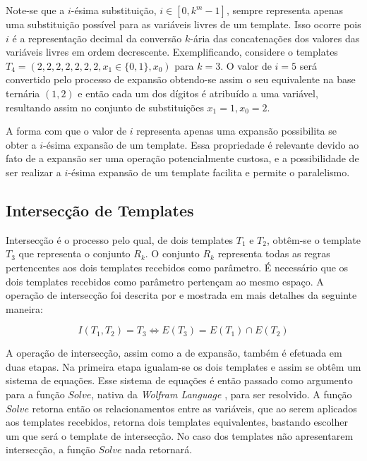 Note-se que a $i$-ésima substituição, $i \in [0,k^m-1]$, sempre representa apenas uma substituição possível para as variáveis livres de um template. Isso ocorre pois $i$ é a representação decimal da conversão $k$-ária das concatenações dos valores das variáveis livres em ordem decrescente. Exemplificando, considere o templates $T_4 = (2,2,2,2,2,2,2,x_1\in \{0,1\},x_0)$ para $k=3$. O valor de $i=5$ será convertido pelo processo de expansão obtendo-se assim o seu equivalente na base ternária $(1,2)$ e então cada um dos dígitos é atribuído a uma variável, resultando assim no conjunto de substituições ${x_1=1,x_0=2}$.

A forma com que o valor de $i$ representa apenas uma expansão possibilita se obter a $i$-ésima expansão de um template. Essa propriedade é relevante devido ao fato de a expansão ser uma operação potencialmente custosa, e a possibilidade de ser realizar a $i$-ésima expansão de um template facilita e permite o paralelismo.

\newpage\newpage
\subsection{Intersecção de Templates}
Intersecção é o processo pelo qual, de dois templates $T_1$ e $T_2$, obtêm-se o template $T_3$ que representa o conjunto $R_k$. O conjunto $R_k$ representa todas as regras pertencentes aos dois templates recebidos como parâmetro. É necessário que os dois templates recebidos como parâmetro pertençam ao mesmo espaço. A operação de intersecção foi descrita por  e mostrada em mais detalhes da seguinte maneira:

\begin{equation}
I(T_1,T_2)=T_3 \Leftrightarrow E(T_3) = E(T_1) \cap E(T_2)
\end{equation}

A operação de intersecção, assim como a de expansão, também é efetuada em duas etapas. Na primeira etapa igualam-se os dois templates e assim se obtêm um sistema de equações. Esse sistema de equações é então passado como argumento para a função $Solve$, nativa da \textit{Wolfram Language} \cite{woframMathematica10}, para ser resolvido. A função $Solve$ retorna então os relacionamentos entre as variáveis, que ao serem aplicados aos templates recebidos, retorna dois templates equivalentes, bastando escolher um que será o template de intersecção. No caso dos templates não apresentarem intersecção, a função $Solve$ nada retornará.

